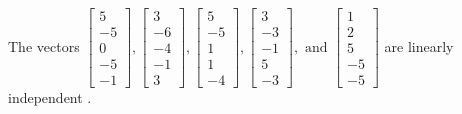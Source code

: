 \begin{exercise}
\begin{exerciseStatement}
  \end{exerciseStatement}
  \begin{exerciseAnswer}
   The vectors \(\left[\begin{array}{r}
5 \\
-5 \\
0 \\
-5 \\
-1
\end{array}\right] , \left[\begin{array}{r}
3 \\
-6 \\
-4 \\
-1 \\
3
\end{array}\right] , \left[\begin{array}{r}
5 \\
-5 \\
1 \\
1 \\
-4
\end{array}\right] , \left[\begin{array}{r}
3 \\
-3 \\
-1 \\
5 \\
-3
\end{array}\right] , \text{ and } \left[\begin{array}{r}
1 \\
2 \\
5 \\
-5 \\
-5
\end{array}\right]\) are 
  	 linearly independent  .
  


  \end{exerciseAnswer}
\end{exercise}
